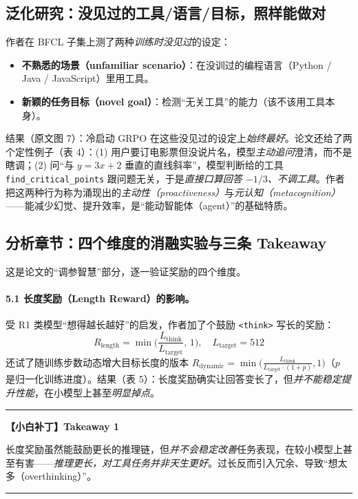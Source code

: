 \documentclass[11pt,UTF8,fontset=fandol]{ctexart}
\newenvironment{tip}[1]{%
  \par\smallskip\noindent\rule{\linewidth}{0.4pt}\par\nobreak
  \noindent\textbf{【小白补丁】#1}\par\nobreak\noindent\ignorespaces
}{%
  \par\noindent\rule{\linewidth}{0.4pt}\par\smallskip
}
\begin{document}
\subsection{泛化研究：没见过的工具/语言/目标，照样能做对}

作者在 BFCL 子集上测了两种\emph{训练时没见过}的设定：
\begin{itemize}[leftmargin=1.5em]
\item \textbf{不熟悉的场景（unfamiliar scenario）}：在没训过的编程语言（Python / Java / JavaScript）里用工具。
\item \textbf{新颖的任务目标（novel goal）}：检测“无关工具”的能力（该不该用工具本身）。
\end{itemize}
结果（原文图 7）：冷启动 GRPO 在这些没见过的设定上\emph{始终最好}。论文还给了两个定性例子（表 4）：(1) 用户要订电影票但没说片名，模型\emph{主动追问}澄清，而不是瞎调；(2) 问“与 $y=3x+2$ 垂直的直线斜率”，模型判断给的工具 \texttt{find\_critical\_points} 跟问题无关，于是\emph{直接口算回答 $-1/3$、不调工具}。作者把这两种行为称为涌现出的\emph{主动性（proactiveness）}与\emph{元认知（metacognition）}——能减少幻觉、提升效率，是“能动智能体（agent）”的基础特质。

\subsection{分析章节：四个维度的消融实验与三条 Takeaway}

这是论文的“调参智慧”部分，逐一验证奖励的四个维度。

\paragraph{5.1 长度奖励（Length Reward）的影响。}受 R1 类模型“想得越长越好”的启发，作者加了个鼓励 \texttt{<think>} 写长的奖励：
\[
R_{\text{length}}=\min\!\Big(\frac{L_{\text{think}}}{L_{\text{target}}},\,1\Big),\quad L_{\text{target}}=512
\]
还试了随训练步数动态增大目标长度的版本 $R_{\text{dynamic}}=\min\!\big(\frac{L_{\text{think}}}{L_{\text{target}}\cdot(1+p)},1\big)$（$p$ 是归一化训练进度）。结果（表 5）：长度奖励确实让回答变长了，但\emph{并不能稳定提升性能}，在小模型上甚至\emph{明显掉点}。
\begin{tip}{Takeaway 1}
长度奖励虽然能鼓励更长的推理链，但\emph{并不会稳定改善}任务表现，在较小模型上甚至有害——\emph{推理更长，对工具任务并非天生更好}。过长反而引入冗余、导致“想太多（overthinking）”。
\end{tip}
\end{document}
